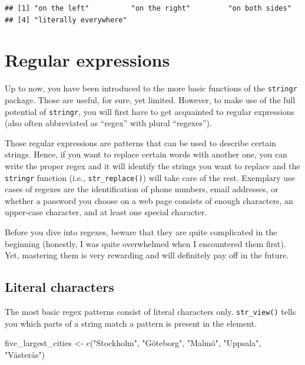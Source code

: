 \documentclass[
]{book}
\newenvironment{Shaded}{\begin{snugshade}}{\end{snugshade}}
\newcommand{\FunctionTok}[1]{\textcolor[rgb]{0.00,0.00,0.00}{#1}}
\newcommand{\NormalTok}[1]{#1}
\newcommand{\OtherTok}[1]{\textcolor[rgb]{0.56,0.35,0.01}{#1}}
\newcommand{\StringTok}[1]{\textcolor[rgb]{0.31,0.60,0.02}{#1}}
\begin{document}
\begin{verbatim}
## [1] "on the left"          "on the right"         "on both sides"       
## [4] "literally everywhere"
\end{verbatim}

\hypertarget{regular-expressions}{%
\section{Regular expressions}\label{regular-expressions}}

Up to now, you have been introduced to the more basic functions of the \texttt{stringr} package. Those are useful, for sure, yet limited. However, to make use of the full potential of \texttt{stringr}, you will first have to get acquainted to regular expressions (also often abbreviated as ``regex'' with plural ``regexes'').

Those regular expressions are patterns that can be used to describe certain strings. Hence, if you want to replace certain words with another one, you can write the proper regex and it will identify the strings you want to replace and the \texttt{stringr} function (i.e., \texttt{str\_replace()}) will take care of the rest. Exemplary use cases of regexes are the identification of phone numbers, email addresses, or whether a password you choose on a web page consists of enough characters, an upper-case character, and at least one special character.

Before you dive into regexes, beware that they are quite complicated in the beginning (honestly, I was quite overwhelmed when I encountered them first). Yet, mastering them is very rewarding and will definitely pay off in the future.

\hypertarget{literal-characters}{%
\subsection{Literal characters}\label{literal-characters}}

The most basic regex patterns consist of literal characters only. \texttt{str\_view()} tells you which parts of a string match a pattern is present in the element.

\begin{Shaded}
\begin{Highlighting}[]
\NormalTok{five\_largest\_cities }\OtherTok{\textless{}{-}} \FunctionTok{c}\NormalTok{(}\StringTok{"Stockholm"}\NormalTok{, }\StringTok{"Göteborg"}\NormalTok{, }\StringTok{"Malmö"}\NormalTok{, }\StringTok{"Uppsala"}\NormalTok{, }\StringTok{"Västerås"}\NormalTok{)}
\end{Highlighting}
\end{Shaded}
\end{document}
